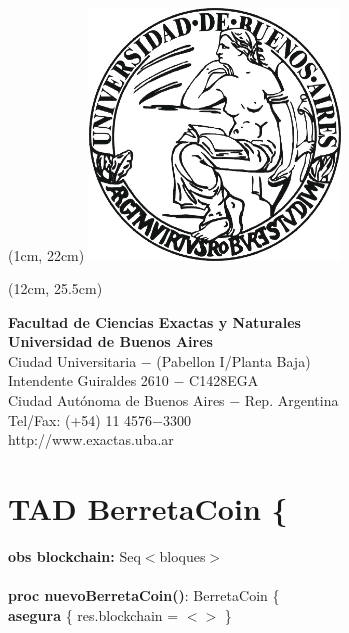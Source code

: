 \documentclass{article}
\begin{document}
\begin{textblock*}{17cm} (1cm, 22cm)
    {
    \includegraphics[width=0.5\textwidth]{uba_logo.jpg}
    }
\end{textblock*}

\begin{textblock*}{20cm} (12cm, 25.5cm)
    {\raggedright\textbf{Facultad de Ciencias Exactas y Naturales}\\
    \textbf{Universidad de Buenos Aires}\\
    Ciudad Universitaria $-$ (Pabellon I/Planta Baja)\\
    Intendente Guiraldes 2610 $-$ C1428EGA\\
    Ciudad Autónoma de Buenos Aires $-$ Rep. Argentina\\
    Tel/Fax: (+54) 11 4576$-$3300\\
    http://www.exactas.uba.ar
    }
\end{textblock*}



\newpage












\setcounter{page}{1}
\section*{TAD \textdollar BerretaCoin \{}
    \textbf{obs blockchain:} Seq$<$bloques$>$\\\\

    \textbf{proc nuevoBerretaCoin()}: BerretaCoin \{\\
        \indent\indent \textbf{asegura} \{ res.blockchain = $<>$ \}
\end{document}
